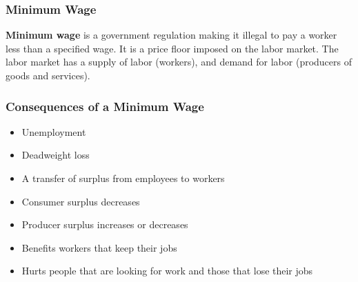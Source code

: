 \documentclass[letterpaper, 12pt]{article}
\begin{document}
\subsubsection{Minimum Wage}
\textbf{Minimum wage} is a government regulation making it illegal to pay a
worker less than a specified wage. It is a price floor imposed on the labor
market. The labor market has a supply of labor (workers), and demand for labor
(producers of goods and services).

\subsubsection{Consequences of a Minimum Wage}
\begin{itemize}
  \item Unemployment
  \item Deadweight loss
  \item A transfer of surplus from employees to workers
  \item Consumer surplus decreases
  \item Producer surplus increases or decreases
  \item Benefits workers that keep their jobs
  \item Hurts people that are looking for work and those that lose their jobs
\end{itemize}
\end{document}
